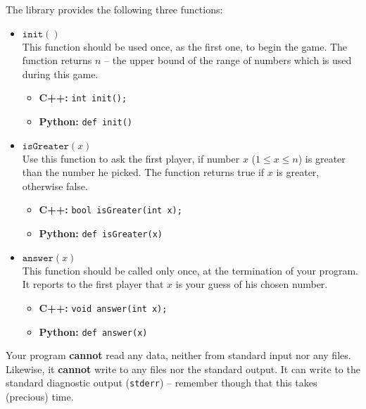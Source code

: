 \documentclass{spiral}
\begin{document}
    \medskip\noindent
    The library provides the following three functions:
    \begin{itemize}
        \item $\texttt{init}()$ \\
            This function should be used once, as the first one, to begin the game.
            The function returns $n$ -- the upper bound of the range of numbers 
            which is used during this game.
            \begin{itemize}
                \item \textbf{C++:}
		                \texttt{int init();}

                \item \textbf{Python:}
		                \texttt{def init()}
            \end{itemize}

        \item $\texttt{isGreater}(x)$ \\
            Use this function to ask the first player,
            if number $x$ ($1 \leq x \leq n$)
            is greater than the number he picked.
            The function returns true if $x$ is greater, otherwise false.
            \begin{itemize}
                \item \textbf{C++:}
		                \texttt{bool isGreater(int x);}

                \item \textbf{Python:}
		                \texttt{def isGreater(x)}
            \end{itemize}

        \item $\texttt{answer}(x)$ \\
            This function should be called only once,
            at the termination of your program.
            It reports to the first player that $x$
            is your guess of his chosen number.
            \begin{itemize}
                \item \textbf{C++:}
		                \texttt{void answer(int x);}
                \item \textbf{Python:}
		                \texttt{def answer(x)}
                \end{itemize}
            \end{itemize}


    Your program \textbf{cannot} read any data,
    neither from standard input nor any files.
    Likewise, it \textbf{cannot} write to any files nor the standard output.
    It can write to the standard diagnostic output (\texttt{stderr}) -- remember
    though that this takes (precious) time.
\end{document}
